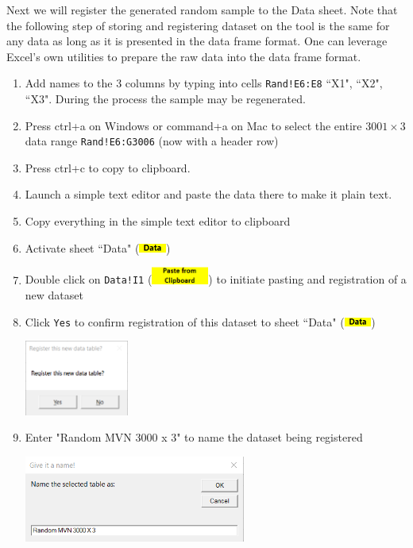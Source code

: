 \documentclass[article]{jss}
\numberwithin{equation}{subsection}
\newcommand{\shtData}{``Data" (\includegraphics[height=8pt, keepaspectratio=true]{DataSheetTab_png}) }
\begin{document}
        Next we will register the generated random sample to the Data sheet. Note that the following step of storing and registering dataset on the tool is the same for any data as long as it is presented in the data frame format. One can leverage Excel's own utilities to prepare the raw data into the data frame format.
        \begin{enumerate}
        \item Add names to the 3 columns by typing into cells \texttt{Rand!E6:E8} ``X1", ``X2", ``X3". During the process the sample may be regenerated.
        \item Press ctrl+a on Windows or command+a on Mac to select the entire $3001\times 3$ data range \texttt{Rand!E6:G3006} (now with a header row)
        \item Press ctrl+c to copy to clipboard.
        \item Launch a simple text editor and paste the data there to make it plain text.
        \item Copy everything in the simple text editor to clipboard
        \item Activate sheet \shtData
        \item Double click on \texttt{Data!I1} (\includegraphics[height=16pt,keepaspectratio=true]{DataSheet_PasteFromClipboardButton_png}) to initiate pasting and registration of a new dataset
        \item Click \texttt{Yes} to confirm registration of this dataset to sheet \shtData
        \begin{center}
	        \vspace{-10pt}\includegraphics[height=70pt, keepaspectratio=true]{DataSheet_ConfirmRegister_png}\vspace{-10pt}
        \end{center}
        \item Enter "Random MVN 3000 x 3" to name the dataset being registered
        \begin{center}
	        \vspace{-10pt}\includegraphics[height=80pt, keepaspectratio=true]{DataSheet_GiveDatasetName_png}\vspace{-10pt}

\end{center}
\end{enumerate}
\end{document}
